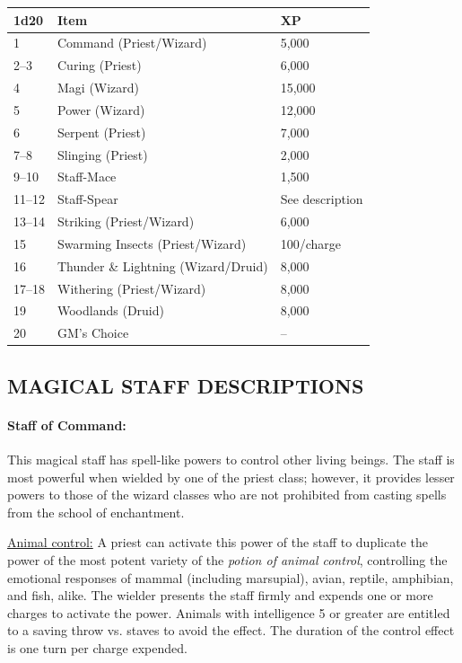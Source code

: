 \begin{multicols}{2}
\begin{minipage}{\columnwidth}
\label{staves}
\noindent
\begin{tabular}{|p{}|p{}|p{}|}
\hline
1d20	& Item	& XP \\
\hline\hline
\rowcolor[gray]{.9}1	& Command (Priest/Wizard)	& 5,000 \\
2--3	& Curing (Priest)	& 6,000 \\
\rowcolor[gray]{.9}4	& Magi (Wizard)	& 15,000 \\
5	& Power (Wizard)	& 12,000 \\
\rowcolor[gray]{.9}6	& Serpent (Priest)	& 7,000 \\
7--8	& Slinging (Priest)	& 2,000 \\
\rowcolor[gray]{.9}9--10	& Staff-Mace	& 1,500 \\
11--12	& Staff-Spear	& See description \\
\rowcolor[gray]{.9}13--14	& Striking (Priest/Wizard)	& 6,000 \\
15	& Swarming Insects (Priest/Wizard)	& 100/charge \\
\rowcolor[gray]{.9}16	& Thunder \& Lightning (Wizard/Druid)	& 8,000 \\
17--18	& Withering (Priest/Wizard)	& 8,000 \\
\rowcolor[gray]{.9}19	& Woodlands (Druid)	& 8,000 \\
20	& GM's Choice	& -- \\
\hline
\end{tabular}

\end{minipage}

\subsection{MAGICAL STAFF DESCRIPTIONS}

\paragraph{Staff of Command:} This magical staff has spell-like powers to control other living beings.  The staff is most powerful when wielded by one of the priest class; however, it provides lesser powers to those of the wizard classes who are not prohibited from casting spells from the school of enchantment. 

\underline{Animal control:} A priest can activate this power of the staff to duplicate the power of the most potent variety of the \textit{potion of animal control}, controlling the emotional responses of mammal (including marsupial), avian, reptile, amphibian, and fish, alike.  The wielder presents the staff firmly and expends one or more charges to activate the power.  Animals with intelligence 5 or greater are entitled to a saving throw vs. staves to avoid the effect.  The duration of the control effect is one turn per charge expended.


\end{multicols}
